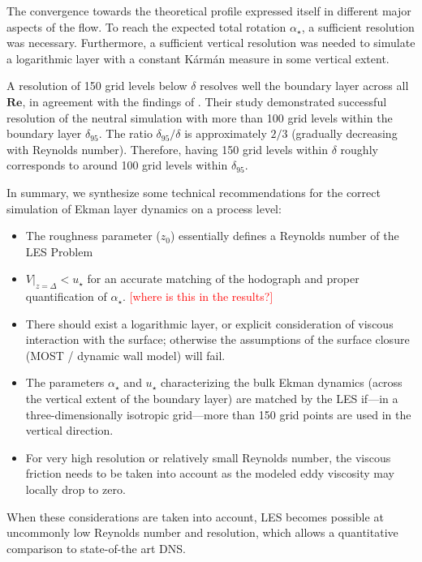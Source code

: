 \documentclass[draft,a4paper,11pt]{article}
\newcommand{\todo}[1]{\textcolor{red}{$[$#1$]$}}
\newcommand{\RE}{\mathbf{Re}}
\begin{document}
The convergence towards the theoretical profile expressed itself in different major aspects of the flow. To reach the expected total rotation $\alpha_\star$, a sufficient resolution was necessary. Furthermore, a sufficient vertical resolution was needed to simulate a logarithmic layer with a constant K\'arm\'an measure in some vertical extent.

A resolution of 150 grid levels below $\delta$ resolves well the boundary layer across all $\RE$, in agreement with the findings of \cite{wurps2020grid}. Their study demonstrated successful resolution of the neutral simulation with more than 100 grid levels within the boundary layer $\delta_{95}$. The ratio $\delta_{95}/\delta$ is approximately $2/3$ (gradually decreasing with Reynolds number). Therefore, having 150 grid levels within $\delta$ roughly corresponds to around 100 grid levels within $\delta_{95}$.

In summary, we synthesize some technical recommendations for the correct simulation of Ekman layer dynamics on a process level:
\begin{itemize}
\item The roughness parameter ($z_0$) essentially defines a Reynolds number of the LES Problem
\item $V|_{z=\Delta} < u_\star$ for an accurate matching of the hodograph and proper quantification of $\alpha_\star$. \todo{where is this in the results?}
\item There should exist a logarithmic layer, or explicit consideration of viscous interaction with the surface; otherwise the assumptions of the surface closure (MOST / dynamic wall model) will fail.
\item The parameters $\alpha_\star$ and $u_\star$ characterizing the bulk Ekman dynamics (across the vertical extent of the boundary layer) are matched by the LES if---in a three-dimensionally isotropic grid---more than 150 grid points are used in the vertical direction.
\item For very high resolution or relatively small Reynolds number, the viscous friction needs to be taken into account as the modeled eddy viscosity may locally drop to zero.
\end{itemize}

When these considerations are taken into account, LES becomes possible at uncommonly low Reynolds number and resolution, which allows a quantitative comparison to state-of-the art DNS.
\end{document}
